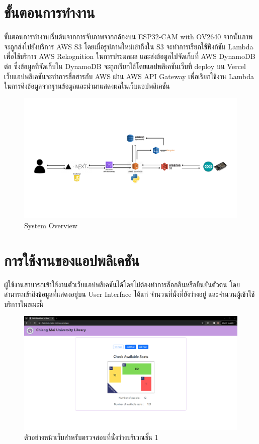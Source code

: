 \section{ขั้นตอนการทำงาน}
ขั้นตอนการทำงานเริ่มต้นจากการจับภาพจากกล้องบน ESP32-CAM with OV2640 จากนั้นภาพจะถูกส่งไปยังบริการ AWS S3 โดยเมื่อรูปภาพใหม่เข้าถึงใน S3 จะทำการเรียกใช้ฟังก์ชัน Lambda เพื่อใช้บริการ AWS Rekognition ในการประมลผล และส่งข้อมูลไปจัดเก็บที่ AWS DynamoDB ต่อ ซึ่งข้อมูลที่จัดเก็บใน DynamoDB จะถูกเรียกใช้โดยแอปพลิเคชันเว็บที่ deploy บน Vercel 
เว็บแอปพลิเคชันจะทำการสื่อสารกับ AWS ผ่าน AWS API Gateway เพื่อเรียกใช้งาน Lambda ในการดึงข้อมูลจากฐานข้อมูลและนำมาแสดงผลในเว็บแอปพลิเคชัน
\begin{figure}[h]
\centering
\includegraphics[width=\textwidth]{images/System Diagram.png}
\caption[System Overview]{System Overview}
\label{fig:System}
\end{figure}

\newpage
\section{การใช้งานของแอปพลิเคชัน}
ผู้ใช้งานสามารถเข้าใช้งานตัวเว็บแอปพลิเคชันได้โดยไม่ต้องทำการล็อกอินหรือยืนยันตัวตน โดยสามารถเข้าถึงข้อมูลที่แสดงอยู่บน User Interface ได้แก่ จำนวนที่นั่งที่ยังว่างอยู่ และจำนวนผู้เข้าใช้บริการในขณะนี้ 
\begin{figure}[h]
\centering
\includegraphics[width=\textwidth]{images/web1.png}
\caption[ตัวอย่างหน้าเว็บสำหรับตรวจสอบที่นั่งว่างบริเวณชั้น 1]{ตัวอย่างหน้าเว็บสำหรับตรวจสอบที่นั่งว่างบริเวณชั้น 1}
\label{fig:web1}
\end{figure}

